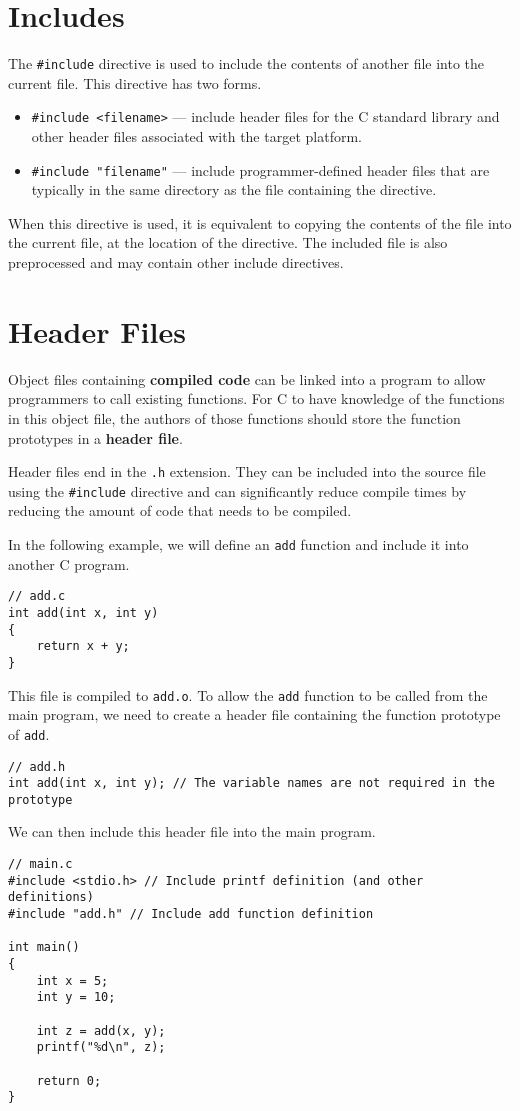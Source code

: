 \documentclass{report}
\begin{document}
\section{Includes}
The \texttt{#include} directive is used to include the contents
of another file into the current file. This directive has two forms.
\begin{itemize}
    \item \texttt{#include <filename>} --- include header files for the C standard library and other header files associated with the target platform.
    \item \texttt{#include "filename"} --- include programmer-defined header files that are typically in the same directory as the file containing the directive. %
\end{itemize}
When this directive is used, it is equivalent to copying the contents of the file into the current file,
at the location of the directive. The included file is also preprocessed and may contain other include directives.
\section{Header Files}
Object files containing \textbf{compiled code} can be linked into a
program to allow programmers to call existing functions. For C to have
knowledge of the functions in this object file, the authors of those
functions should store the function prototypes in a \textbf{header
file}.

Header files end in the \texttt{.h} extension. They can be
included into the source file using the \texttt{#include}
directive and can significantly reduce compile times by reducing the
amount of code that needs to be compiled.

In the following example, we will define an \texttt{add}
function and include it into another C program.
\begin{verbatim}
// add.c
int add(int x, int y)
{
    return x + y;
}
\end{verbatim}
This file is compiled to \texttt{add.o}. To allow the
\texttt{add} function to be called from the main program, we
need to create a header file containing the function prototype of
\texttt{add}.
\begin{verbatim}
// add.h
int add(int x, int y); // The variable names are not required in the prototype
\end{verbatim}
We can then include this header file into the main program.
\begin{verbatim}
// main.c
#include <stdio.h> // Include printf definition (and other definitions)
#include "add.h" // Include add function definition

int main()
{
    int x = 5;
    int y = 10;

    int z = add(x, y);
    printf("%d\n", z);

    return 0;
}
\end{verbatim}
\end{document}
